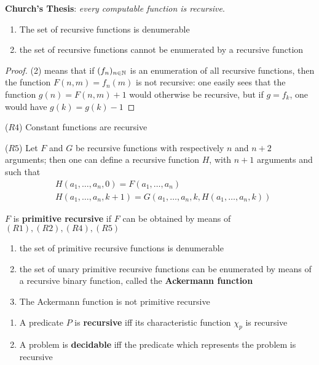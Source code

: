 \documentclass[11pt]{article}
\begin{document}
\textbf{Church's Thesis}: \emph{every computable function is recursive}.

\begin{theorem}[]
\begin{enumerate}
\item The set of recursive functions is denumerable
\item the set of recursive functions cannot be enumerated by a recursive function
\end{enumerate}
\end{theorem}
\begin{proof}
(2) means that if \((f_n)_{n\in\mathbb{N}}\) is an enumeration of all recursive functions,
then the function \(F(n,m)=f_n(m)\) is not recursive: one easily sees that the
function \(g(n)=F(n,m)+1\) would otherwise be recursive, but if \(g=f_k\), one would
have \(g(k)=g(k)-1\)
\end{proof}

\begin{theorem}[]
(\(R4\)) Constant functions are recursive

(\(R5\)) Let \(F\) and \(G\) be recursive functions with respectively \(n\) and \(n+2\)
arguments; then one can define a recursive function \(H\), with \(n+1\) arguments
and such that
\begin{align*}
&H(a_1,\dots,a_n,0)=F(a_1,\dots,a_n)\\
&H(a_1,\dots,a_n,k+1)=G(a_1,\dots,a_n,k,H(a_1,\dots,a_n,k))
\end{align*}
\end{theorem}

\begin{definition}[]
\(F\) is \textbf{primitive recursive} if \(F\) can be obtained by means of
\((R1),(R2),(R4),(R5)\) 
\end{definition}


\begin{theorem}
\begin{enumerate}
\item the set of primitive recursive functions is denumerable
\item the set of unary primitive recursive functions can be enumerated by means of
a recursive binary function, called the \textbf{Ackermann function}
\item The Ackermann function is not primitive recursive
\end{enumerate}
\end{theorem}

\begin{definition}[]
\begin{enumerate}
\item A predicate \(P\) is \textbf{recursive} iff its characteristic function \(\chi_p\) is
recursive
\item A problem is \textbf{decidable} iff the predicate which represents the problem is
recursive
\end{enumerate}
\end{definition}
\end{document}
